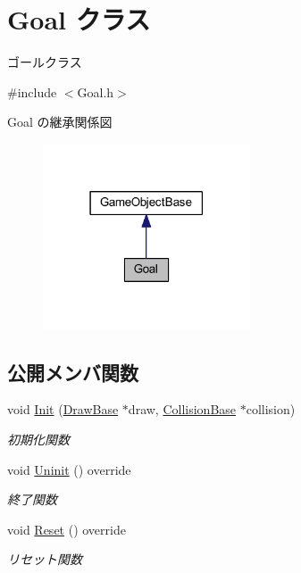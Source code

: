 \hypertarget{class_goal}{}\section{Goal クラス}
\label{class_goal}


ゴールクラス  




{\ttfamily \#include $<$Goal.\+h$>$}



Goal の継承関係図\nopagebreak
\begin{figure}[H]
\begin{center}
\leavevmode
\includegraphics[width=174pt]{class_goal__inherit__graph}
\end{center}
\end{figure}
\subsection*{公開メンバ関数}
\begin{DoxyCompactItemize}
\item 
void \mbox{\hyperlink{class_goal_a694beb5a9164e2bea59fc43affbaa060}{Init}} (\mbox{\hyperlink{class_draw_base}{Draw\+Base}} $\ast$draw, \mbox{\hyperlink{class_collision_base}{Collision\+Base}} $\ast$collision)
\begin{DoxyCompactList}\small\item\em 初期化関数 \end{DoxyCompactList}\item 
void \mbox{\hyperlink{class_goal_a48126385a674bcda855e2a61561fbf9f}{Uninit}} () override
\begin{DoxyCompactList}\small\item\em 終了関数 \end{DoxyCompactList}\item 
void \mbox{\hyperlink{class_goal_a98b797c8012ab43d6fc8c42e4e91466b}{Reset}} () override
\begin{DoxyCompactList}\small\item\em リセット関数 \end{DoxyCompactList}\end{DoxyCompactItemize}
